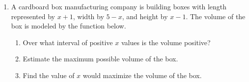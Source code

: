 \documentclass[12pt, twoside]{article}
\begin{document}
\begin{enumerate}
\newpage
\item A cardboard box manufacturing company is building boxes with length represented by $x+1$, width by $5-x$, and height by $x-1$. The volume of the box is modeled by the function below.
    \begin{multicols}{2}
    
    \begin{enumerate}[itemsep=0.75cm]
        \item Over what interval of positive $x$ values is the volume positive?
        \item Estimate the maximum possible volume of the box.
        \item Find the value of $x$ would maximize the volume of the box.
    \end{enumerate} 
\end{multicols}


\end{enumerate}
\end{document}
